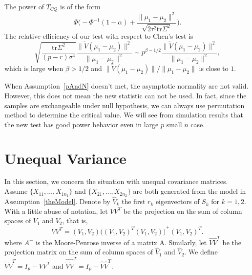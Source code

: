 \documentclass[review]{elsarticle}
\theoremstyle{plain}
\theoremstyle{definition}
\theoremstyle{remark}
\begin{document}
 The power of $T_{CQ}$ is of the form
\begin{equation*}
    \Phi\Big(-\Phi^{-1}(1-\alpha)+\frac{\|\mu_1-\mu_2\|^2}{\sqrt{2\tau^2\mathrm{tr}\Sigma^2}}\Big).
\end{equation*}
 The relative efficiency of our test with respect to Chen's test is
\begin{equation*}
    \sqrt{\frac{\mathrm{tr}\Sigma^2}{(p-r)\sigma^4}}\frac{\|\tilde{V}(\mu_1-\mu_2)\|^2}{\|\mu_1-\mu_2\|^2}\sim p^{\beta-1/2}\frac{\|\tilde{V}(\mu_1-\mu_2)\|^2}{\|\mu_1-\mu_2\|^2},
\end{equation*}
which is large when $\beta>1/2$ and $\|\tilde{V}(\mu_1-\mu_2)\|/\|\mu_1-\mu_2\|$ is close to $1$.

When Assumption~\ref{pAndN} doesn't met, the asymptotic normality are not valid.
However, this does not mean the new statistic can not be used.
In fact, since the samples are exchangeable under null hypothesis, we can always use permutation method to determine the critical value.
We will see from simulation results that the new test has good power behavior even in large $p$ small $n$ case.


\section{Unequal Variance}

In this section, we concern the situation with unequal covariance matrices.
Assume $\{X_{11},\ldots, X_{1n_1}\}$ and $\{X_{21},\ldots, X_{2n_2}\}$ are both generated from the model in Assumption~\ref{theModel}.
Denote by $\hat{V}_k$ the first $r_k$ eigenvectors of $S_k$ for $k=1,2$.
With a little abuse of notation, let $VV^T$ be the projection on the sum of column spaces of $V_1$ and $V_2$, that is,
\begin{equation*}
    VV^T =(V_1,V_2){\big({(V_1,V_2)}^T (V_1,V_2)\big)}^{+}{(V_1,V_2)}^T.
\end{equation*}
where $A^{+}$ is the Moore-Penrose inverse of a matrix A. Similarly, let $\hat{V}\hat{V}^T$ be the projection matrix on the sum of column spaces of $\hat{V}_1$ and $\hat{V}_2$.
 We define $\tilde{V}\tilde{V}^T=I_{p}-VV^T$ and $\hat{\tilde{V}}\hat{\tilde{V}}^T=I_{p}-\hat{V}\hat{V}^T$. 
\end{document}
